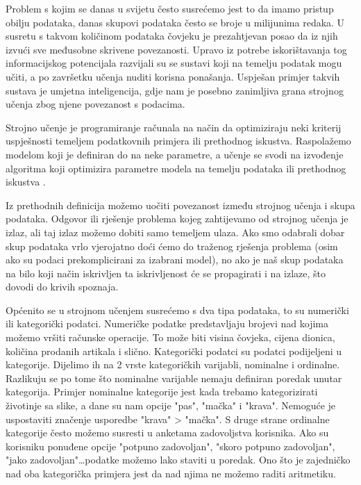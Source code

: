 \documentclass[times, utf8, zavrsni, numeric]{fer}
\begin{document}
Problem s kojim se danas u svijetu često susrećemo jest to da imamo pristup obilju podataka, danas skupovi podataka često se broje u milijunima redaka. U susretu s takvom količinom podataka čovjeku je prezahtjevan posao da iz njih izvući sve međusobne skrivene povezanosti. Upravo iz potrebe iskorištavanja tog informacijskog potencijala razvijali su se sustavi koji na temelju podatak mogu učiti, a po završetku učenja nuditi korisna ponašanja. Uspješan primjer takvih sustava je umjetna inteligencija, gdje nam je posebno zanimljiva grana strojnog učenja zbog njene povezanost s podacima.

Strojno učenje je programiranje računala na način da optimiziraju neki kriterij uspješnosti temeljem podatkovnih primjera ili prethodnog iskustva. Raspolažemo modelom koji je definiran do na neke parametre, a učenje se svodi na izvođenje algoritma koji optimizira parametre modela na temelju podataka ili prethodnog iskustva \citep{alpaydin2020introduction}.

Iz prethodnih definicija možemo uočiti povezanost između strojnog učenja i skupa podataka. Odgovor ili rješenje problema kojeg zahtijevamo od strojnog učenja je izlaz, ali taj izlaz možemo dobiti samo temeljem ulaza. Ako smo odabrali dobar skup podataka vrlo vjerojatno doći ćemo do traženog rješenja problema (osim ako su podaci prekomplicirani za izabrani model), no ako je naš skup podataka na bilo koji način iskrivljen ta iskrivljenost će se propagirati i na izlaze, što dovodi do krivih spoznaja.

Općenito se u strojnom učenjem susrećemo s dva tipa podataka, to su numerički ili kategorički podatci. Numeričke podatke predstavljaju brojevi nad kojima možemo vršiti računske operacije. To može biti visina čovjeka, cijena dionica, količina prodanih artikala i slično. Kategorički podatci su podatci podijeljeni u kategorije. Dijelimo ih na 2 vrste kategoričkih varijabli, nominalne i ordinalne. Razlikuju se po tome što nominalne varijable nemaju definiran poredak unutar kategorija. Primjer nominalne kategorije jest kada trebamo kategorizirati životinje sa slike, a dane su nam opcije "pas", "mačka" i "krava". Nemoguće je uspostaviti značenje usporedbe "krava" > "mačka". S druge strane ordinalne kategorije često možemo susresti u anketama zadovoljstva korisnika. Ako su korisniku ponuđene opcije "potpuno zadovoljan", "skoro potpuno zadovoljan", "jako zadovoljan"\dots podatke možemo lako staviti u poredak. Ono što je zajedničko nad oba kategorička primjera jest da nad njima ne možemo raditi aritmetiku. 
\end{document}
